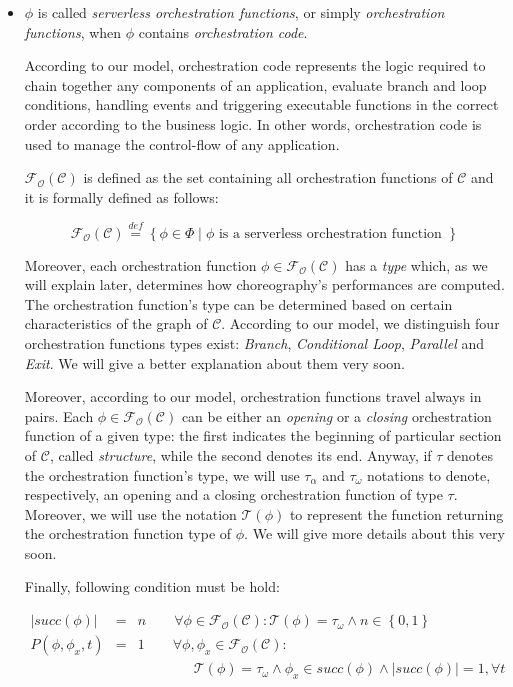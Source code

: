 \documentclass[12pt,a4paper]{report}
\newcommand{\mathDef}{\overset{\textit{def}}{=}}
\begin{document}
\begin{itemize}
	\item $\phi$ is called \textit{serverless orchestration functions}, or simply \textit{orchestration functions}, when $\phi$ contains \textit{orchestration code}. 
	
	According to our model, orchestration code represents the logic required to chain together any components of an application, evaluate branch and loop conditions, handling events and triggering executable functions in the correct order according to the business logic. In other words, orchestration code is used to manage the control-flow of any application.
	
	$\mathscr{F_O}(\mathcal{C})$ is defined as the set containing all orchestration functions of $\mathcal{C}$ and it is formally defined as follows:
	
	\begin{equation}
		\mathscr{F_O}(\mathcal{C}) \mathDef \left\lbrace \phi \in \Phi \mid \phi \text{ is a serverless orchestration function }\right\rbrace 
	\end{equation}

	Moreover, each orchestration function $\phi \in \mathscr{F_O}(\mathcal{C})$ has a \textit{type} which, as we will explain later, determines how choreography's performances are computed. The orchestration function's type can be determined based on certain characteristics of the graph of $\mathcal{C}$. According to our model, we distinguish four orchestration functions types exist: \textit{Branch}, \textit{Conditional Loop}, \textit{Parallel} and \textit{Exit}. We will give a better explanation about them very soon.

	Moreover, according to our model, orchestration functions travel always in pairs. Each $\phi \in \mathscr{F_O}(\mathcal{C})$ can be either an \textit{opening} or a \textit{closing} orchestration function of a given type: the first indicates the beginning of particular section of $\mathcal{C}$, called \textit{structure}, while the second denotes its  end. Anyway, if $\tau$ denotes the orchestration function's type, we will use $\tau_{\alpha}$ and $\tau_{\omega}$ notations to denote, respectively, an opening and a closing orchestration function of type $\tau$. Moreover, we will use the notation $\mathscr{T}(\phi)$ to represent the function returning the orchestration function type of $\phi$. We will give more details about this very soon.
	
	Finally, following condition must be hold:
	
	\begin{eqnarray}
		|succ(\phi)| & = & n \qquad \forall \phi \in \mathscr{F_O}(\mathcal{C}) : \mathscr{T}(\phi) = \tau_{\omega} \wedge n \in \left\{0,1\right\} \\		
		P(\phi, \phi_x,t) & = & 1 \qquad \forall \phi, \phi_x \in \mathscr{F_O}(\mathcal{C}) : \\		
		& & \qquad \qquad \mathscr{T}(\phi) = \tau_{\omega} \wedge \phi_x \in succ(\phi) \wedge |succ(\phi)| = 1, \forall t \qquad \qquad  \nonumber
	\end{eqnarray}
	
\end{itemize}
\end{document}
